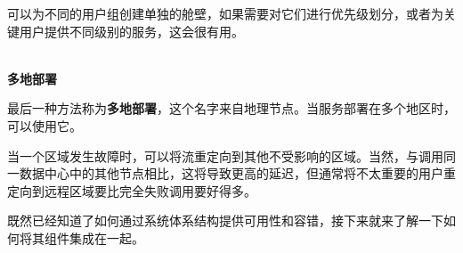 可以为不同的用户组创建单独的舱壁，如果需要对它们进行优先级划分，或者为关键用户提供不同级别的服务，这会很有用。

\hspace*{\fill} \\ %
\noindent
\textbf{多地部署}

最后一种方法称为\textbf{多地部署}，这个名字来自地理节点。当服务部署在多个地区时，可以使用它。

当一个区域发生故障时，可以将流重定向到其他不受影响的区域。当然，与调用同一数据中心中的其他节点相比，这将导致更高的延迟，但通常将不太重要的用户重定向到远程区域要比完全失败调用要好得多。

既然已经知道了如何通过系统体系结构提供可用性和容错，接下来就来了解一下如何将其组件集成在一起。






















